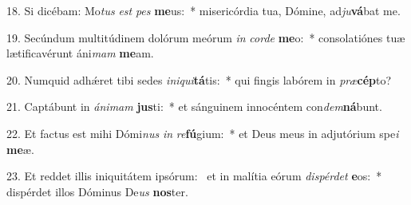 18. Si dicébam: Mo\textit{tus} \textit{est} \textit{pes} \textbf{me}us:~*  misericórdia tua, Dómine, ad\textit{ju}\textbf{vá}bat me.\

19. Secúndum multitúdinem dolórum meórum \textit{in} \textit{cor}\textit{de} \textbf{me}o:~*  consolatiónes tuæ lætificavérunt áni\textit{mam} \textbf{me}am.\

20. Numquid adhǽret tibi sedes \textit{in}\textit{i}\textit{qui}\textbf{tá}tis:~*  qui fingis labórem in \textit{præ}\textbf{cép}to?\

21. Captábunt in \textit{á}\textit{ni}\textit{mam} \textbf{jus}ti:~*  et sánguinem innocéntem con\textit{dem}\textbf{ná}bunt.\

22. Et factus est mihi Dómi\textit{nus} \textit{in} \textit{re}\textbf{fú}gium:~*  et Deus meus in adjutórium spe\textit{i} \textbf{me}æ.\

23. Et reddet illis iniquitátem ipsórum: \dag\  et in malítia eórum \textit{dis}\textit{pér}\textit{det} \textbf{e}os:~*  dispérdet illos Dóminus De\textit{us} \textbf{nos}ter.\

